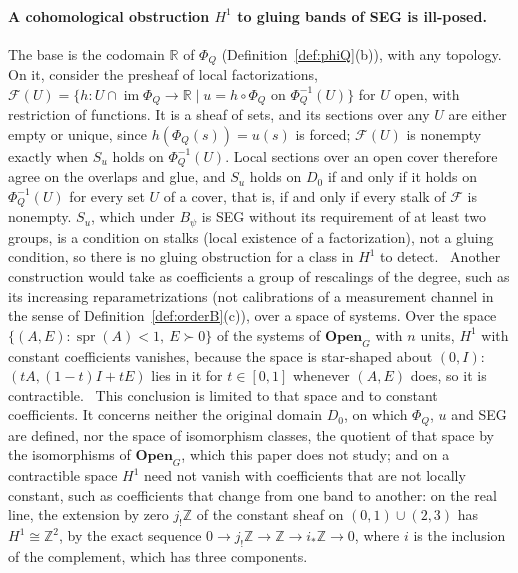 \paragraph{A cohomological obstruction $H^1$ to gluing bands of SEG is ill-posed.} The base is the codomain $\mathbb R$ of $\Phi_Q$ (Definition~\ref{def:phiQ}(b)), with any topology. On it, consider the presheaf of local factorizations, $\mathcal F(U)=\{h:U\cap\operatorname{im}\Phi_Q\to\mathbb R \mid u=h\circ\Phi_Q \text{ on } \Phi_Q^{-1}(U)\}$ for $U$ open, with restriction of functions. It is a sheaf of sets, and its sections over any $U$ are either empty or unique, since $h(\Phi_Q(s))=u(s)$ is forced; $\mathcal F(U)$ is nonempty exactly when $S_u$ holds on $\Phi_Q^{-1}(U)$. Local sections over an open cover therefore agree on the overlaps and glue, and $S_u$ holds on $D_0$ if and only if it holds on $\Phi_Q^{-1}(U)$ for every set $U$ of a cover, that is, if and only if every stalk of $\mathcal F$ is nonempty. $S_u$, which under $B_\psi$ is SEG without its requirement of at least two groups, is a condition on stalks (local existence of a factorization), not a gluing condition, so there is no gluing obstruction for a class in $H^1$ to detect. \stA\ Another construction would take as coefficients a group of rescalings of the degree, such as its increasing reparametrizations (not calibrations of a measurement channel in the sense of Definition~\ref{def:orderB}(c)), over a space of systems. Over the space $\{(A,E):\operatorname{spr}(A)<1,\ E\succ0\}$ of the systems of $\mathbf{Open}_G$ with $n$ units, $H^1$ with constant coefficients vanishes, because the space is star-shaped about $(0,I)$: $(tA,(1-t)I+tE)$ lies in it for $t\in[0,1]$ whenever $(A,E)$ does, so it is contractible. \stA\ This conclusion is limited to that space and to constant coefficients. It concerns neither the original domain $D_0$, on which $\Phi_Q$, $u$ and SEG are defined, nor the space of isomorphism classes, the quotient of that space by the isomorphisms of $\mathbf{Open}_G$, which this paper does not study; and on a contractible space $H^1$ need not vanish with coefficients that are not locally constant, such as coefficients that change from one band to another: on the real line, the extension by zero $j_!\mathbb Z$ of the constant sheaf on $(0,1)\cup(2,3)$ has $H^1\cong\mathbb Z^2$, by the exact sequence $0\to j_!\mathbb Z\to\mathbb Z\to i_*\mathbb Z\to0$, where $i$ is the inclusion of the complement, which has three components.


